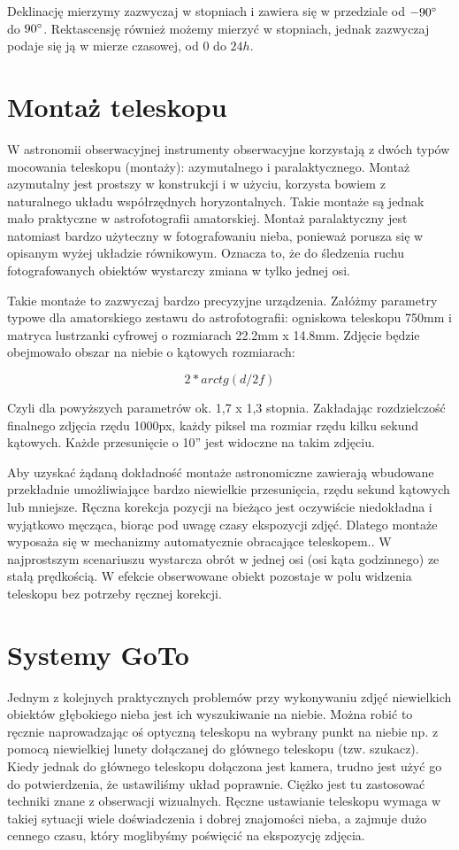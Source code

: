 Deklinację mierzymy zazwyczaj w stopniach i zawiera się w przedziale od
$-90\degree$ do $90\degree$. Rektascensję również możemy mierzyć w stopniach,
jednak zazwyczaj podaje się ją w mierze czasowej, od $0$ do $24h$.

\section{Montaż teleskopu}

W astronomii obserwacyjnej instrumenty obserwacyjne korzystają z dwóch typów
mocowania teleskopu (montaży): azymutalnego i paralaktycznego. Montaż azymutalny
jest prostszy w konstrukcji i w użyciu, korzysta bowiem z naturalnego układu
współrzędnych horyzontalnych. Takie montaże są jednak mało praktyczne
w astrofotografii amatorskiej. Montaż paralaktyczny jest natomiast bardzo
użyteczny w fotografowaniu nieba, ponieważ porusza się w opisanym wyżej układzie
równikowym. Oznacza to, że do śledzenia ruchu fotografowanych obiektów wystarczy
zmiana w tylko jednej osi. 

Takie montaże to zazwyczaj bardzo precyzyjne urządzenia. Załóżmy parametry
typowe dla amatorskiego zestawu do astrofotografii: ogniskowa teleskopu 750mm
i matryca lustrzanki cyfrowej o rozmiarach 22.2mm x 14.8mm. Zdjęcie będzie
obejmowało obszar na niebie o kątowych rozmiarach:

$$2*arc tg(d/2f)$$

Czyli dla powyższych parametrów ok. 1,7 x 1,3 stopnia. Zakładając rozdzielczość
finalnego zdjęcia rzędu 1000px, każdy piksel ma rozmiar rzędu kilku sekund
kątowych. Każde przesunięcie o 10'' jest widoczne na takim zdjęciu.

Aby uzyskać żądaną dokładność montaże astronomiczne zawierają wbudowane
przekładnie umożliwiające bardzo niewielkie przesunięcia, rzędu sekund
kątowych lub mniejsze. Ręczna korekcja pozycji na bieżąco jest oczywiście
niedokładna i wyjątkowo męcząca, biorąc pod uwagę czasy ekspozycji zdjęć.
Dlatego montaże wyposaża się w mechanizmy automatycznie obracające teleskopem..
W najprostszym scenariuszu wystarcza obrót w jednej osi (osi kąta godzinnego) ze
stałą prędkością. W efekcie obserwowane obiekt pozostaje w polu widzenia
teleskopu bez potrzeby ręcznej korekcji.

\section{Systemy GoTo}

Jednym z kolejnych praktycznych problemów przy wykonywaniu zdjęć niewielkich
obiektów głębokiego nieba jest ich wyszukiwanie na niebie. Można robić to
ręcznie naprowadzając oś optyczną teleskopu na wybrany punkt na niebie np.
z pomocą niewielkiej lunety dołączanej do głównego teleskopu (tzw. szukacz).
Kiedy jednak do głównego teleskopu dołączona jest kamera, trudno jest użyć go
do potwierdzenia, że ustawiliśmy układ poprawnie. Ciężko jest tu zastosować
techniki znane z obserwacji wizualnych. Ręczne ustawianie teleskopu wymaga
w takiej sytuacji wiele doświadczenia i dobrej znajomości nieba, a zajmuje
dużo cennego czasu, który moglibyśmy poświęcić na ekspozycję zdjęcia.


